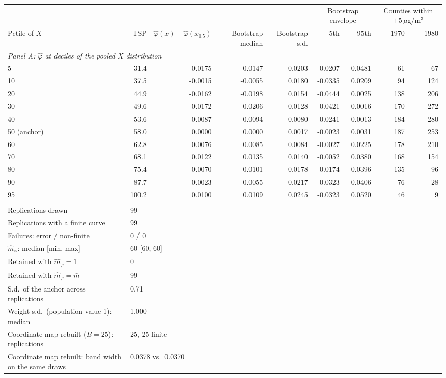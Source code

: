 \begin{tabular}{lrrrrrrrr}
\toprule
& & & & & \multicolumn{2}{c}{Bootstrap envelope} & \multicolumn{2}{c}{Counties within $\pm5\,\mu$g/m$^3$} \\
\cmidrule(lr){6-7} \cmidrule(lr){8-9}
Pctile of $X$ & TSP & $\hat\varphi(x)-\hat\varphi(x_{0.5})$ & Bootstrap median & Bootstrap s.d. & 5th & 95th & 1970 & 1980 \\
\midrule
\multicolumn{9}{l}{\textit{Panel A: $\hat\varphi$ at deciles of the pooled $X$ distribution}} \\
\midrule
5 & 31.4 & 0.0175 & 0.0147 & 0.0203 & -0.0207 & 0.0481 & 61 & 67 \\
10 & 37.5 & -0.0015 & -0.0055 & 0.0180 & -0.0335 & 0.0209 & 94 & 124 \\
20 & 44.9 & -0.0162 & -0.0198 & 0.0154 & -0.0444 & 0.0025 & 138 & 206 \\
30 & 49.6 & -0.0172 & -0.0206 & 0.0128 & -0.0421 & -0.0016 & 170 & 272 \\
40 & 53.6 & -0.0087 & -0.0094 & 0.0080 & -0.0241 & 0.0013 & 184 & 280 \\
50 (anchor) & 58.0 & 0.0000 & 0.0000 & 0.0017 & -0.0023 & 0.0031 & 187 & 253 \\
60 & 62.8 & 0.0076 & 0.0085 & 0.0084 & -0.0027 & 0.0225 & 178 & 210 \\
70 & 68.1 & 0.0122 & 0.0135 & 0.0140 & -0.0052 & 0.0380 & 168 & 154 \\
80 & 75.4 & 0.0070 & 0.0101 & 0.0178 & -0.0174 & 0.0396 & 135 & 96 \\
90 & 87.7 & 0.0023 & 0.0055 & 0.0217 & -0.0323 & 0.0406 & 76 & 28 \\
95 & 100.2 & 0.0100 & 0.0109 & 0.0245 & -0.0323 & 0.0520 & 46 & 9 \\
\addlinespace
\multicolumn{9}{l}{\textit{Panel B: multiplier design and convergence}} \\
\midrule
Replications drawn & \multicolumn{8}{l}{99} \\
Replications with a finite curve & \multicolumn{8}{l}{99} \\
Failures: error / non-finite & \multicolumn{8}{l}{0 / 0} \\
$\hat m_\varphi$: median [min, max] & \multicolumn{8}{l}{60 [60, 60]} \\
Retained with $\hat m_\varphi = 1$ & \multicolumn{8}{l}{0} \\
Retained with $\hat m_\varphi = \bar m$ & \multicolumn{8}{l}{99} \\
S.d.\ of the anchor across replications & \multicolumn{8}{l}{0.71} \\
Weight s.d.\ (population value 1): median & \multicolumn{8}{l}{1.000} \\
\addlinespace
Coordinate map rebuilt ($B=25$): replications & \multicolumn{8}{l}{25, 25 finite} \\
Coordinate map rebuilt: band width on the same draws & \multicolumn{8}{l}{0.0378 vs.\ 0.0370} \\
\bottomrule
\end{tabular}

